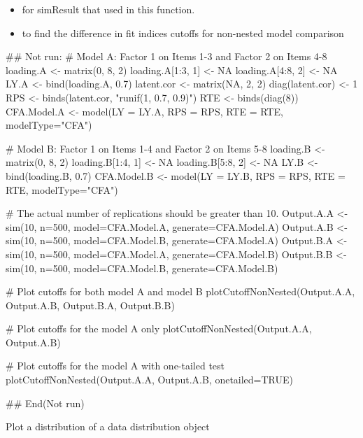 \documentclass[a4paper]{book}
\begin{document}
\begin{SeeAlso}\relax
\begin{itemize}

\item {} for simResult that used in this function.
\item {} to find the difference in fit indices cutoffs for non-nested model comparison

\end{itemize}

\end{SeeAlso}
%
\begin{Examples}
\begin{ExampleCode}
## Not run: 
# Model A: Factor 1 on Items 1-3 and Factor 2 on Items 4-8
loading.A <- matrix(0, 8, 2)
loading.A[1:3, 1] <- NA
loading.A[4:8, 2] <- NA
LY.A <- bind(loading.A, 0.7)
latent.cor <- matrix(NA, 2, 2)
diag(latent.cor) <- 1
RPS <- binds(latent.cor, "runif(1, 0.7, 0.9)")
RTE <- binds(diag(8))
CFA.Model.A <- model(LY = LY.A, RPS = RPS, RTE = RTE, modelType="CFA")

# Model B: Factor 1 on Items 1-4 and Factor 2 on Items 5-8
loading.B <- matrix(0, 8, 2)
loading.B[1:4, 1] <- NA
loading.B[5:8, 2] <- NA
LY.B <- bind(loading.B, 0.7)
CFA.Model.B <- model(LY = LY.B, RPS = RPS, RTE = RTE, modelType="CFA")

# The actual number of replications should be greater than 10.
Output.A.A <- sim(10, n=500, model=CFA.Model.A, generate=CFA.Model.A)
Output.A.B <- sim(10, n=500, model=CFA.Model.B, generate=CFA.Model.A)
Output.B.A <- sim(10, n=500, model=CFA.Model.A, generate=CFA.Model.B)
Output.B.B <- sim(10, n=500, model=CFA.Model.B, generate=CFA.Model.B)

# Plot cutoffs for both model A and model B
plotCutoffNonNested(Output.A.A, Output.A.B, Output.B.A, Output.B.B)

# Plot cutoffs for the model A only
plotCutoffNonNested(Output.A.A, Output.A.B)

# Plot cutoffs for the model A with one-tailed test
plotCutoffNonNested(Output.A.A, Output.A.B, onetailed=TRUE)

## End(Not run)
\end{ExampleCode}
\end{Examples}
%
\begin{Description}\relax
Plot a distribution of a data distribution object
\end{Description}
\end{document}

